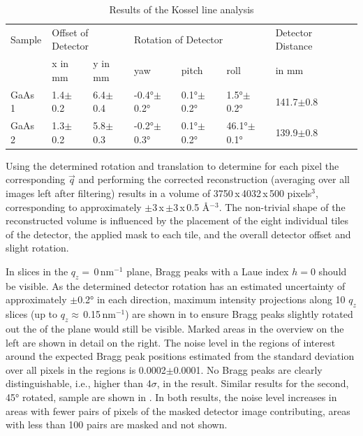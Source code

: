 \begin{table}[]
	\caption{Results of the Kossel line analysis}
	\begin{small}
		\begin{tabular}{llllllll}
			\hline
			Sample & \multicolumn{2}{l}{Offset of Detector} & \multicolumn{3}{l}{Rotation of Detector}  & Detector Distance &  \\
			& x in mm        & y in mm        & yaw              & pitch           & roll           & in mm             &  \\ 
			\hline
			GaAs 1 & 1.4$\pm$0.2    & 6.4$\pm$0.4    & -0.4°$\pm$0.2° & 0.1°$\pm$0.2° & 1.5°$\pm$0.2° & 141.7$\pm$0.8     &  \\
			GaAs 2 & 1.3$\pm$0.2    & 5.8$\pm$0.3    & -0.2°$\pm$0.3° & 0.1°$\pm$0.2° & 46.1°$\pm$0.1° & 139.9$\pm$0.8     &  \\
			\hline
		\end{tabular}
	\end{small}	
	\label{tab:kosselfit}
\end{table}

Using the determined rotation and translation to determine for each pixel the corresponding $\vec{q}$ and performing the corrected reconstruction (averaging over all images left after filtering) results in a volume of 3750\,x\,4032\,x\,500 pixels$^3$, corresponding to approximately $\pm$3\,x\,$\pm$3\,x\,0.5 \AA$^{-3}$. The non-trivial shape of the reconstructed volume is influenced by the placement of the eight individual tiles of the detector, the applied mask to each tile, and the overall detector offset and slight rotation.

In slices in the $q_z=$\,0\,nm$^{-1}$ plane, Bragg peaks with a Laue index $h=0$ should be visible. As the determined detector rotation has an estimated uncertainty of approximately $\pm$0.2° in each direction, maximum intensity projections along 10 $q_z$ slices (up to $q_z\approx$\,0.15\,nm$^{-1}$) are shown in  to ensure Bragg peaks slightly rotated out the of the plane would still be visible. Marked areas in the overview on the left are shown in detail on the right. The noise level in the regions of interest around the expected Bragg peak positions estimated from the standard deviation over all pixels in the regions is 0.0002$\pm$0.0001.  No Bragg peaks are clearly distinguishable, i.e., higher than 4$\sigma$,  in the result. Similar results for the second, 45° rotated, sample are shown in . In both results, the noise level increases in areas with fewer pairs of pixels of the masked detector image contributing, areas with less than 100 pairs are masked and not shown.

